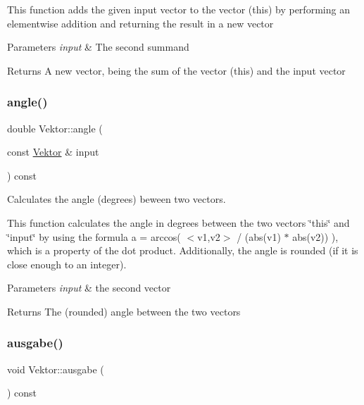 This function adds the given input vector to the vector (this) by performing an elementwise addition and returning the result in a new vector


\begin{DoxyParams}{Parameters}
{\em input} & The second summand\\
\hline
\end{DoxyParams}
\begin{DoxyReturn}{Returns}
A new vector, being the sum of the vector (this) and the input vector 
\end{DoxyReturn}
\mbox{\label{class_vektor_a33baaca0958a73d60f19500ad59d4288}} 
\subsubsection{\texorpdfstring{angle()}{angle()}}
{\footnotesize\ttfamily double Vektor\+::angle (\begin{DoxyParamCaption}\item[{const \hyperlink{class_vektor}{Vektor} \&}]{input }\end{DoxyParamCaption}) const}



Calculates the angle (degrees) beween two vectors. 

This function calculates the angle in degrees between the two vectors \char`\"{}this\char`\"{} and \char`\"{}input\char`\"{} by using the formula a = arccos( $<$v1,v2$>$ / (abs(v1) $\ast$ abs(v2)) ), which is a property of the dot product. Additionally, the angle is rounded (if it is close enough to an integer).


\begin{DoxyParams}{Parameters}
{\em input} & the second vector\\
\hline
\end{DoxyParams}
\begin{DoxyReturn}{Returns}
The (rounded) angle between the two vectors 
\end{DoxyReturn}
\mbox{\label{class_vektor_aa3c41759f0a472327a8970878234675a}} 
\subsubsection{\texorpdfstring{ausgabe()}{ausgabe()}}
{\footnotesize\ttfamily void Vektor\+::ausgabe (\begin{DoxyParamCaption}{ }\end{DoxyParamCaption}) const}



